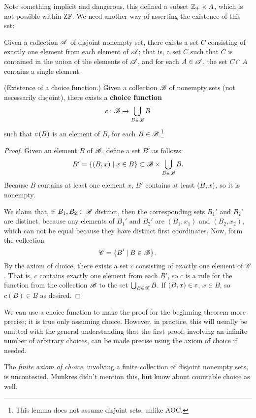 \documentclass{report}
\begin{document}
Note something implicit and dangerous, this defined a subset $\mathbb{Z}_+ \times A$, which is not possible within ZF. We need another way of asserting the existence of this set:

\begin{axiom}
  Given a collection $\mathscr{A}$ of disjoint nonempty set, there exists a set $C$ consisting of exactly one element from each element of $\mathscr{A}$; 
  that is, a set $C$ such that $C$ is contained in the union of the elements of $\mathscr{A}$, and for each $A \in \mathscr{A}$, the set $C \cap A$ contains a single element.
\end{axiom}

\begin{lemma}
  {\normalfont (Existence of a choice function.)}
  Given a collection $\mathscr{B}$ of nonempty sets (not necessarily disjoint), there exists a \textbf{choice function}
  \[
    c: \mathscr{B} \rightarrow \bigcup_{B \in \mathscr{B}} B
  \]
  such that $c \left( B \right)$ is an element of $B$, for each $B \in \mathscr{B}$.\footnote{This lemma does not assume disjoint sets, unlike AOC.}
\end{lemma}
\begin{proof}
  Given an element $B$ of $\mathscr{B}$, define a set $B'$ as follows:
  \[
    B' = \left\{  \left( B,x \right) \mid x \in B \right\} \subset \mathscr{B} \times \bigcup_{B \in \mathscr{B}} B.
  \]
  Because $B$ contains at least one element $x$, $B'$ contains at least $\left( B,x \right)$, so it is nonempty.

  We claim that, if $B_1,B_2 \in \mathscr{B}$ distinct, then the corresponding sets $B_1'$ and $B_2$' are distinct, because any elements of $B_1'$ and $B_2'$ are $(B_1,x_1)$ and $(B_2,x_2)$, which can not be equal because they have distinct first coordinates. 
  Now, form the collection
  \[
    \mathscr{C} = \left\{ B' \mid B \in \mathscr{B} \right\}.
  \]
  By the axiom of choice, there exists a set $c$ consisting of exactly one element of $\mathscr{C}$.
  That is, $c$ contains exactly one element from each $B'$, so $c$ is a rule for the function from the collection $\mathscr{B}$ to the set $\bigcup_{B \in \mathscr{B}} B$.
  If $\left( B,x \right) \in c$, $x \in B$, so $c(B) \in B$ as desired.
\end{proof}

We can use a choice function to make the proof for the beginning theorem more precise; it is true only assuming choice.
However, in practice, this will usually be omitted with the general understanding that the first proof, involving an infinite number of arbitrary choices, can be made precise using the axiom of choice if needed.

The \emph{finite axiom of choice}, involving a finite collection of disjoint nonempty sets, is uncontested.
Munkres  didn't mention this, but know about countable choice as well.
\end{document}
